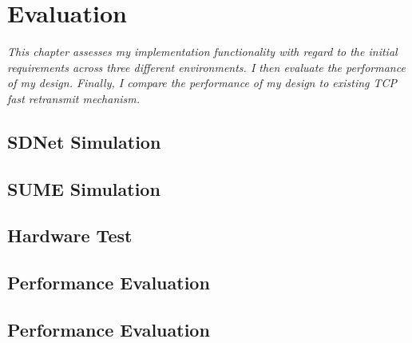 \chapter{Evaluation}
\textit{This chapter assesses my implementation functionality with regard to the initial requirements across three different environments. I then evaluate the performance of my design. Finally, I compare the performance of my design to existing TCP fast retransmit mechanism.}

\section{SDNet Simulation}

\section{SUME Simulation}
\section{Hardware Test}
\section{Performance Evaluation}
\section{Performance Evaluation}

